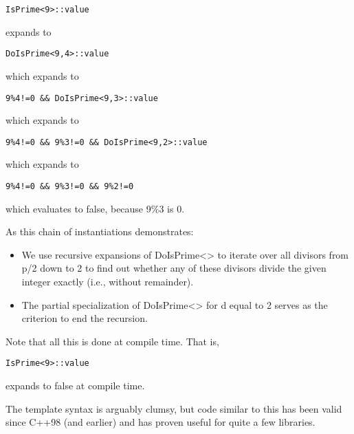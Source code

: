 \begin{lstlisting}[style=styleCXX]
IsPrime<9>::value
\end{lstlisting}

\noindent
expands to

\begin{lstlisting}[style=styleCXX]
DoIsPrime<9,4>::value
\end{lstlisting}

\noindent
which expands to

\begin{lstlisting}[style=styleCXX]
9%4!=0 && DoIsPrime<9,3>::value
\end{lstlisting}

\noindent
which expands to

\begin{lstlisting}[style=styleCXX]
9%4!=0 && 9%3!=0 && DoIsPrime<9,2>::value
\end{lstlisting}

\noindent
which expands to

\begin{lstlisting}[style=styleCXX]
9%4!=0 && 9%3!=0 && 9%2!=0
\end{lstlisting}

\noindent
which evaluates to false, because 9\%3 is 0.

As this chain of instantiations demonstrates:

\begin{itemize}
\item 
We use recursive expansions of DoIsPrime<> to iterate over all divisors from p/2 down to 2 to find out whether any of these divisors divide the given integer exactly (i.e., without remainder).

\item 
The partial specialization of DoIsPrime<> for d equal to 2 serves as the criterion to end the recursion.
\end{itemize}

Note that all this is done at compile time. That is,

\begin{lstlisting}[style=styleCXX]
IsPrime<9>::value
\end{lstlisting}

\noindent
expands to false at compile time.

The template syntax is arguably clumsy, but code similar to this has been valid since C++98 (and earlier) and has proven useful for quite a few libraries.

